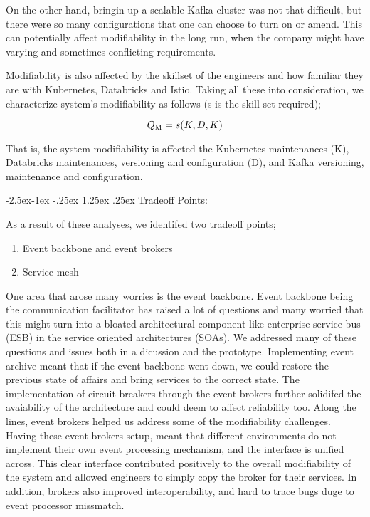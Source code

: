 \documentclass[review]{elsarticle}
\makeatletter
\renewcommand\paragraph{\@startsection{paragraph}{4}{\z@}%
            {-2.5ex\@plus -1ex \@minus -.25ex}%
            {1.25ex \@plus .25ex}%
            {\normalfont\normalsize\itshape}}
\makeatother
\begin{document}
On the other hand, bringin up a scalable Kafka cluster was not that difficult, but there were so many configurations that one can choose to turn on or amend. This can potentially affect modifiability in the long run, when the company might have varying and sometimes conflicting requirements.

Modifiability is also affected by the skillset of the engineers and how familiar they are with Kubernetes, Databricks and Istio. Taking all these into consideration, we characterize system's modifiability as follows (s is the skill set required);

\begin{equation}
    Q\textsubscript{M} = s(K, D, K)
\end{equation}

That is, the system modifiability is affected the Kubernetes maintenances (K), Databricks maintenances, versioning and configuration (D), and Kafka versioning, maintenance and configuration.


\paragraph{Tradeoff Points:}

As a result of these analyses, we identifed two tradeoff points;

\begin{enumerate}
    \item Event backbone and event brokers
    \item Service mesh
\end{enumerate}

One area that arose many worries is the event backbone. Event backbone being the communication facilitator has raised a lot of questions and many worried that this might turn into a bloated architectural component like enterprise service bus (ESB) in the service oriented architectures (SOAs). We addressed many of these questions and issues both in a dicussion and the prototype. Implementing event archive meant that if the event backbone went down, we could restore the previous state of affairs and bring services to the correct state. The implementation of circuit breakers through the event brokers further solidifed the avaiability of the architecture and could deem to affect reliability too. Along the lines, event brokers helped us address some of the modifiability challenges. Having these event brokers setup, meant that different environments do not implement their own event processing mechanism, and the interface is unified across. This clear interface contributed positively to the overall modifiability of the system and allowed engineers to simply copy the broker for their services. In addition, brokers also improved interoperability, and hard to trace bugs duge to event processor missmatch.
\end{document}
